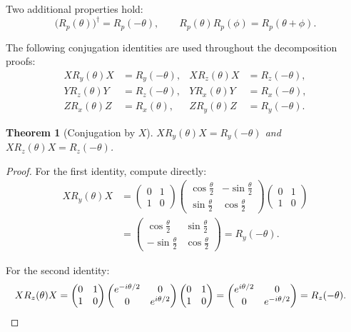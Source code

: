 \documentclass[12pt, a4paper, oneside]{report}
\theoremstyle{plain}
\newtheorem{theorem}{Theorem}[chapter]
\theoremstyle{definition}
\theoremstyle{remark}
\newcommand{\Rx}{R_x}
\newcommand{\Ry}{R_y}
\newcommand{\Rz}{R_z}
\begin{document}
Two additional properties hold:
\[
	\bigl(R_p(\theta)\bigr)^\dagger = R_p(-\theta), \qquad
	R_p(\theta)R_p(\phi) = R_p(\theta+\phi).
\]

The following conjugation identities are used throughout the decomposition proofs:
\begin{align}
	X\Ry(\theta)X & = \Ry(-\theta), & X\Rz(\theta)X & = \Rz(-\theta), \label{eq:conjX} \\
	Y\Rz(\theta)Y & = \Rz(-\theta), & Y\Rx(\theta)Y & = \Rx(-\theta), \label{eq:conjY} \\
	Z\Rx(\theta)Z & = \Rx(\theta),  & Z\Ry(\theta)Z & = \Ry(-\theta). \label{eq:conjZ}
\end{align}

\begin{theorem}[Conjugation by $X$]
	\label{thm:conjX}
	$X\Ry(\theta)X = \Ry(-\theta)$ and $X\Rz(\theta)X = \Rz(-\theta)$.
\end{theorem}

\begin{proof}
	For the first identity, compute directly:
	\begin{align*}
		X\Ry(\theta)X
		 & = \begin{pmatrix}0&1\\1&0\end{pmatrix}
		\begin{pmatrix}\cos\frac{\theta}{2}&-\sin\frac{\theta}{2}\\\sin\frac{\theta}{2}&\cos\frac{\theta}{2}\end{pmatrix}
		\begin{pmatrix}0&1\\1&0\end{pmatrix}                                                                                   \\
		 & = \begin{pmatrix}\cos\frac{\theta}{2}&\sin\frac{\theta}{2}\\-\sin\frac{\theta}{2}&\cos\frac{\theta}{2}\end{pmatrix}
		= \Ry(-\theta). 
	\end{align*}

	For the second identity:
	\begin{align*}
		X\Rz(\theta)X
		 & = \begin{pmatrix}0&1\\1&0\end{pmatrix}
		\begin{pmatrix}e^{-i\theta/2}&0\\0&e^{i\theta/2}\end{pmatrix}
		\begin{pmatrix}0&1\\1&0\end{pmatrix}
		= \begin{pmatrix}e^{i\theta/2}&0\\0&e^{-i\theta/2}\end{pmatrix}
		= \Rz(-\theta). \qedhere
	\end{align*}
\end{proof}
\end{document}
